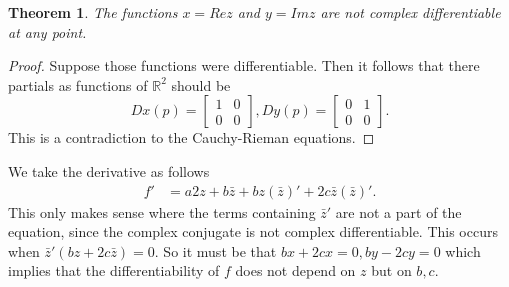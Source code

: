 \documentclass[letter]{article}
\newtheorem{theorem}{Theorem}
\newenvironment{menumerate}{%
  \edef\backupindent{\the\parindent}%
  \enumerate%
  \setlength{\parindent}{\backupindent}%
}{\endenumerate}
\begin{document}
\begin{menumerate}
 	\item 
 	\begin{theorem}
 		The functions $x= Re z$ and $y = Im z$ are not complex differentiable
 		at any point.
 	\end{theorem}
 	\begin{proof}
 		Suppose those functions were differentiable. Then it follows that
 		there partials as functions of $\mathbb{R}^2$ should be 
 		\begin{equation}
 			Dx(p) = \begin{bmatrix}
 				1 & 0 \\
 				0 & 0
 			\end{bmatrix},
 			Dy(p) = \begin{bmatrix}
 				0 & 1 \\
 				0 & 0
 			\end{bmatrix}.
 		\end{equation}
 		This is a contradiction to the Cauchy-Rieman equations.
 	\end{proof}
 	\item We take the derivative as follows
 	\begin{equation}
 		\begin{aligned}
 			f' &= a2z + b\bar z + bz(\bar z)' + 2c\bar z (\bar z)'.
 		\end{aligned}
 	\end{equation}
 	This only makes sense where the terms containing $\bar z ' $ are not a part of
 	the equation, since the complex conjugate is not complex differentiable.
 	This occurs when $\bar z'(bz + 2c\bar z) = 0.$ So it must be that
 	$bx +2cx = 0, by - 2cy = 0$ which implies that the differentiability of
 	$f$ does not depend on $z$ but on $b,c.$


\end{menumerate}
\end{document}

